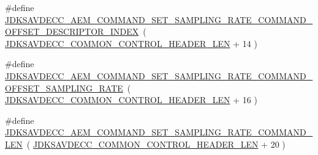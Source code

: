 \begin{DoxyCompactItemize}
\item 
\#define \hyperlink{group__command__set__sampling__rate_ga664b4432990c0a0b15deddcca3bd7aed}{J\+D\+K\+S\+A\+V\+D\+E\+C\+C\+\_\+\+A\+E\+M\+\_\+\+C\+O\+M\+M\+A\+N\+D\+\_\+\+S\+E\+T\+\_\+\+S\+A\+M\+P\+L\+I\+N\+G\+\_\+\+R\+A\+T\+E\+\_\+\+C\+O\+M\+M\+A\+N\+D\+\_\+\+O\+F\+F\+S\+E\+T\+\_\+\+D\+E\+S\+C\+R\+I\+P\+T\+O\+R\+\_\+\+I\+N\+D\+EX}~( \hyperlink{group__jdksavdecc__avtp__common__control__header_gaae84052886fb1bb42f3bc5f85b741dff}{J\+D\+K\+S\+A\+V\+D\+E\+C\+C\+\_\+\+C\+O\+M\+M\+O\+N\+\_\+\+C\+O\+N\+T\+R\+O\+L\+\_\+\+H\+E\+A\+D\+E\+R\+\_\+\+L\+EN} + 14 )
\item 
\#define \hyperlink{group__command__set__sampling__rate_gaf323cd27060c4f209de6584a4cb664cb}{J\+D\+K\+S\+A\+V\+D\+E\+C\+C\+\_\+\+A\+E\+M\+\_\+\+C\+O\+M\+M\+A\+N\+D\+\_\+\+S\+E\+T\+\_\+\+S\+A\+M\+P\+L\+I\+N\+G\+\_\+\+R\+A\+T\+E\+\_\+\+C\+O\+M\+M\+A\+N\+D\+\_\+\+O\+F\+F\+S\+E\+T\+\_\+\+S\+A\+M\+P\+L\+I\+N\+G\+\_\+\+R\+A\+TE}~( \hyperlink{group__jdksavdecc__avtp__common__control__header_gaae84052886fb1bb42f3bc5f85b741dff}{J\+D\+K\+S\+A\+V\+D\+E\+C\+C\+\_\+\+C\+O\+M\+M\+O\+N\+\_\+\+C\+O\+N\+T\+R\+O\+L\+\_\+\+H\+E\+A\+D\+E\+R\+\_\+\+L\+EN} + 16 )
\item 
\#define \hyperlink{group__command__set__sampling__rate_ga358f271b698b9b1a581bcd9ad29cc4e5}{J\+D\+K\+S\+A\+V\+D\+E\+C\+C\+\_\+\+A\+E\+M\+\_\+\+C\+O\+M\+M\+A\+N\+D\+\_\+\+S\+E\+T\+\_\+\+S\+A\+M\+P\+L\+I\+N\+G\+\_\+\+R\+A\+T\+E\+\_\+\+C\+O\+M\+M\+A\+N\+D\+\_\+\+L\+EN}~( \hyperlink{group__jdksavdecc__avtp__common__control__header_gaae84052886fb1bb42f3bc5f85b741dff}{J\+D\+K\+S\+A\+V\+D\+E\+C\+C\+\_\+\+C\+O\+M\+M\+O\+N\+\_\+\+C\+O\+N\+T\+R\+O\+L\+\_\+\+H\+E\+A\+D\+E\+R\+\_\+\+L\+EN} + 20 )
\end{DoxyCompactItemize}
